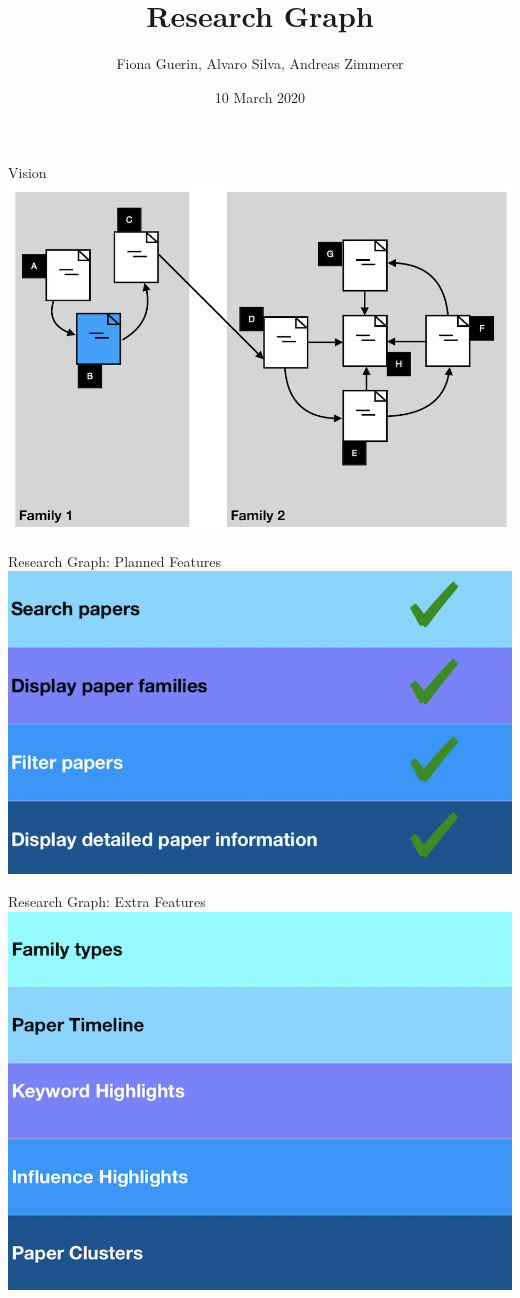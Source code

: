 \documentclass{beamer}
\title[Research Graph]{Research Graph}
\author[Guerin, Silva, Zimmerer]{Fiona Guerin, Alvaro Silva, Andreas Zimmerer}
\institute{Technical University of Munich}
\date{10 March 2020}
\begin{document}
\maketitle

\begin{frame}{Vision}
    \includegraphics{img_02.png}
\end{frame}

\begin{frame}{Research Graph: Planned Features}
    \includegraphics{img_19.png}
\end{frame}

\begin{frame}{Research Graph: Extra Features}
    \includegraphics{img_20.png}
\end{frame}
\end{document}
